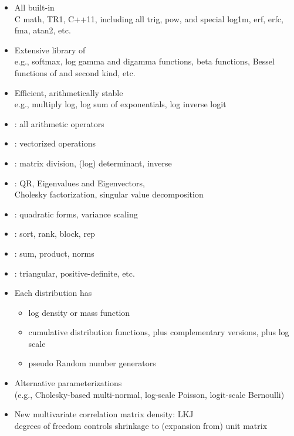 \documentclass[10pt]{report}
\newcommand{\sld}[1]{\newpage{\noindent\LARGE \ \ \
    \textcolor{MidnightBlue}{\bfseries #1}}\vspace*{4pt}}
\newcommand{\myemph}[1]{{\color{MidnightBlue}{\bfseries #1}}}
\begin{document}
\sld{Built-in Math Functions}

\begin{itemize}
\item All built-in \myemph{C++ functions and operators}
  \\
  {\footnotesize C math, TR1, C++11, including all trig, pow, and
    special log1m, erf, erfc, fma, atan2, etc.}
\item Extensive library of \myemph{statistical functions}
  \\
  {\footnotesize e.g., softmax,
    log gamma and digamma functions, beta functions, Bessel functions of
    and second kind, etc.}
\item Efficient, arithmetically stable \myemph{compound functions}
  \\
  {\footnotesize e.g., multiply log, log sum of
    exponentials, log inverse logit}
\end{itemize}

\sld{Built-in Matrix Functions}

\begin{itemize}
\item \myemph{Basic arithmetic}: all arithmetic operators
\item \myemph{Elementwise arithmetic}: vectorized operations
\item \myemph{Solvers}: matrix division, (log) determinant,
  inverse 
\item \myemph{Decompositions}: QR, Eigenvalues and Eigenvectors, 
  \\
  Cholesky factorization, singular value decomposition
\item \myemph{Compound Operations}: quadratic forms, variance scaling
\item \myemph{Ordering, Slicing, Broadcasting}: sort, rank, block, rep
\item \myemph{Reductions}: sum, product, norms
\item \myemph{Specializations}: triangular, positive-definite, etc.
\end{itemize}

\sld{Distribution Library}

\begin{itemize}
\item Each distribution has
  \vspace*{-4pt}
  \begin{itemize}\small
  \item log density or mass function
  \item cumulative distribution functions, plus complementary versions,
    plus log scale
  \item pseudo Random number generators
  \end{itemize}
\item Alternative parameterizations
  \\
  {\footnotesize (e.g., Cholesky-based multi-normal,
    log-scale Poisson, logit-scale Bernoulli)}
\item New multivariate correlation matrix density: LKJ
  \\
  {\footnotesize degrees of freedom controls 
    shrinkage to (expansion from) unit matrix}
\end{itemize}
\end{document}
